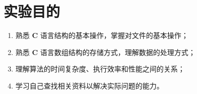 \section{实验目的}
    \begin{enumerate}
        \item 熟悉 \textbf{C} 语言结构的基本操作，掌握对文件的基本操作；
        \item 熟悉 \textbf{C} 语言数组结构的存储方式，理解数据的处理方式；
        \item 理解算法的时间复杂度、执行效率和性能之间的关系；
        \item 学习自己查找相关资料以解决实际问题的能力。
    \end{enumerate}
